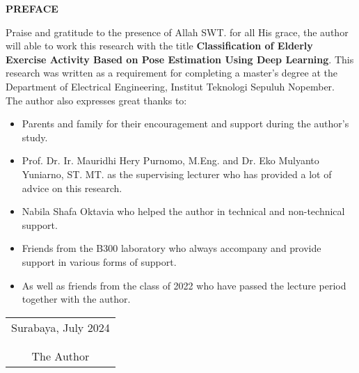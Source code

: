 \begin{center}
	\Large\textbf{PREFACE}
\end{center}
\vspace{2ex}
Praise and gratitude to the presence of Allah SWT. for all His grace, the author will able to work this research with the title \textbf{Classification of Elderly Exercise Activity Based on Pose Estimation Using Deep Learning}. This research was written as a requirement for completing a master’s degree at the Department of Electrical Engineering, Institut Teknologi Sepuluh Nopember.\\
The author also expresses great thanks to:
\begin{itemize}
	\item Parents and family for their encouragement and
	      support during the author’s study.
	\item Prof. Dr. Ir. Mauridhi Hery Purnomo, M.Eng. and Dr. Eko Mulyanto Yuniarno, ST. MT. as the supervising lecturer who has provided a lot of advice on this research.
	\item Nabila Shafa Oktavia who helped the author in technical and non-technical support.
	\item Friends from the B300 laboratory who always accompany and provide support in various forms of support.
	\item As well as friends from the class of 2022 who have passed the lecture period together with the author.
\end{itemize}
\vspace{26pt}
\begin{flushright}
	\begin{tabular}[b]{c}
		Surabaya, July 2024
		\\
		\\
		\\
		The Author
	\end{tabular}
\end{flushright}
